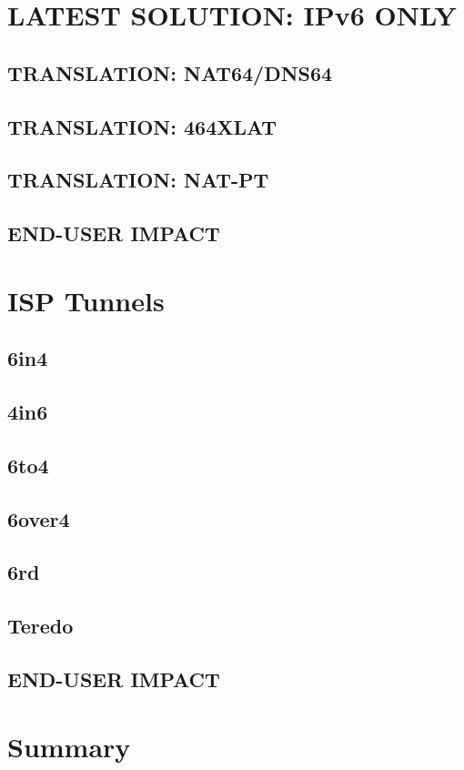 \documentclass[format=sigconf, natbib=true, nonacm=true]{acmart}
\begin{document}
    \section{LATEST SOLUTION: IPv6 ONLY}
    \lipsum[21]
    \subsection{TRANSLATION: NAT64/DNS64}
    \lipsum[22-24]
    \subsection{TRANSLATION: 464XLAT}
    \lipsum[24-26]
    \subsection{TRANSLATION: NAT-PT}
    \lipsum[26-28]
    \subsection*{END-USER IMPACT}
    \lipsum[18-21]

    \section{ISP Tunnels}
    \lipsum[21]
    \subsection{6in4}
    \lipsum[22-24]
    \subsection{4in6}
    \lipsum[24-26]
    \subsection{6to4}
    \lipsum[26-28]
    \subsection*{6over4}
    \lipsum[18-21]
    \subsection{6rd}
    \lipsum[26-28]
    \subsection*{Teredo}
    \lipsum[18-21]
    \subsection*{END-USER IMPACT}
    \lipsum[18-22]

    \section{Summary}
    \lipsum[100-104]

    
    
\end{document}
